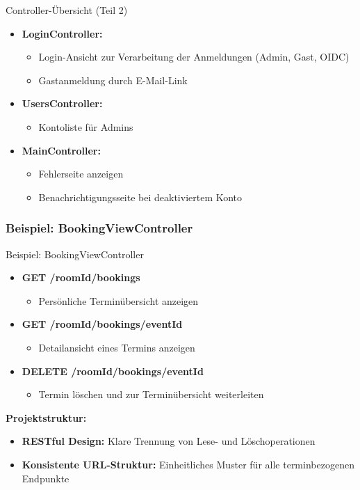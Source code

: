 \documentclass{sdqbeamer}
\begin{document}
\begin{frame}{Controller-Übersicht (Teil 2)}
    \begin{itemize}
        \item \textbf{LoginController:}
        \begin{itemize}
            \item Login-Ansicht zur Verarbeitung der Anmeldungen (Admin, Gast, OIDC)
            \item Gastanmeldung durch E-Mail-Link
        \end{itemize}
        \item \textbf{UsersController:}
        \begin{itemize}
            \item Kontoliste für Admins
        \end{itemize}
        \item \textbf{MainController:}
        \begin{itemize}
            \item Fehlerseite anzeigen
            \item Benachrichtigungsseite bei deaktiviertem Konto
        \end{itemize}
    \end{itemize}
\end{frame}

\subsubsection{Beispiel: BookingViewController}

\begin{frame}{Beispiel: BookingViewController}
    \begin{itemize}
        \item \textbf{GET /{roomId}/bookings}
        \begin{itemize}
            \item Persönliche Terminübersicht anzeigen
        \end{itemize}
        \item \textbf{GET /{roomId}/bookings/{eventId}}
        \begin{itemize}
            \item Detailansicht eines Termins anzeigen
        \end{itemize}
        \item \textbf{DELETE /{roomId}/bookings/{eventId}}
        \begin{itemize}
            \item Termin löschen und zur Terminübersicht weiterleiten
        \end{itemize}
    \end{itemize}
    \vspace{1em}
    \textbf{Projektstruktur:}
    \begin{itemize}
        \item \textbf{RESTful Design:} Klare Trennung von Lese- und Löschoperationen
        \item \textbf{Konsistente URL-Struktur:} Einheitliches Muster für alle terminbezogenen Endpunkte
    \end{itemize}
\end{frame}
\end{document}
